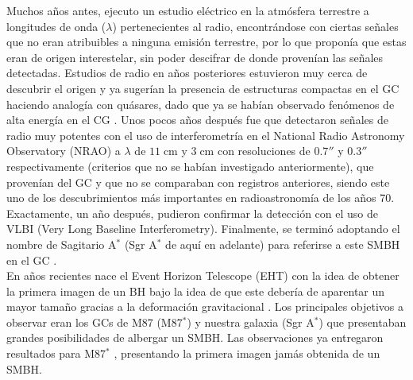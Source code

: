 \documentclass[11pt,letterpaper]{article}
\begin{document}
Muchos años antes, \cite{jansky1933electrical} ejecuto un estudio eléctrico en la atmósfera terrestre a longitudes de onda ($\lambda$) pertenecientes al radio, encontrándose con ciertas señales que no eran atribuibles a ninguna emisión terrestre, por lo que proponía que estas eran de origen interestelar, sin poder descifrar de donde provenían las señales detectadas. Estudios de radio en años posteriores estuvieron muy cerca de descubrir el origen \citep{clark, minley} y ya sugerían la presencia de estructuras compactas en el GC haciendo analogía con quásares, dado que ya se habían observado fenómenos de alta energía en el CG \citep{lynden, lyndenress}. Unos pocos años después fue que \cite{balick1974intense} detectaron señales de radio muy potentes con el uso de interferometría en el National Radio Astronomy Observatory (NRAO) a $\lambda$ de $11\;\text{cm}$ y $3\;\text{cm}$ con resoluciones de $0.7''$ y $0.3''$ respectivamente (criterios que no se habían investigado anteriormente), que provenían del GC y que no se comparaban con registros anteriores, siendo este uno de los descubrimientos más importantes en radioastronomía de los años 70. Exactamente, un año después, \cite{lo1} pudieron confirmar la detección con el uso de VLBI (Very Long Baseline Interferometry). Finalmente, se terminó adoptando el nombre de Sagitario A$^*$ (Sgr A$^*$ de aquí en adelante) para referirse a este SMBH en el GC \citep{brownestrella}.\\
En años recientes nace el Event Horizon Telescope (EHT) con la idea de obtener la primera imagen de un BH bajo la idea de que este debería de aparentar un mayor tamaño gracias a la deformación gravitacional \citep{campbell}. Los principales objetivos a observar eran los GCs de M87 (M87$^*$) y nuestra galaxia (Sgr A$^*$) que presentaban grandes posibilidades de albergar un SMBH. Las observaciones ya entregaron resultados para M87$^*$ \citep{2019ApJ...875L...2E}, presentando la primera imagen jamás obtenida de un SMBH.
\newpage

\end{document}
